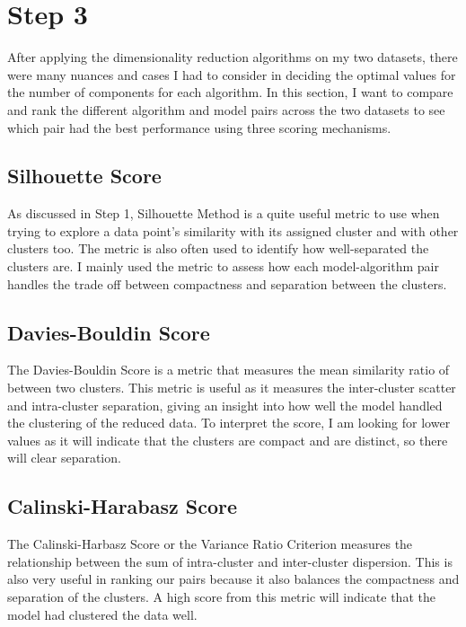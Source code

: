 \documentclass[conference]{IEEEtran}
\begin{document}
\section{Step 3}
After applying the dimensionality reduction algorithms on my two datasets, there were many nuances and cases I had to consider in deciding the optimal values for the number of components for each algorithm. In this section, I want to compare and rank the different algorithm and model pairs across the two datasets to see which pair had the best performance using three scoring mechanisms.
\subsection{Silhouette Score}
\par As discussed in Step 1, Silhouette Method is a quite useful metric to use when trying to explore a data point's similarity with its assigned cluster and with other clusters too. The metric is also often used to identify how well-separated the clusters are. I mainly used the metric to assess how each model-algorithm pair handles the trade off between compactness and separation between the clusters.
\subsection{Davies-Bouldin Score}
\par The Davies-Bouldin Score is a metric that measures the mean similarity ratio of between two clusters. This metric is useful as it measures the inter-cluster scatter and intra-cluster separation, giving an insight into how well the model handled the clustering of the reduced data. To interpret the score, I am looking for lower values as it will indicate that the clusters are compact and are distinct, so there will clear separation.
\subsection{Calinski-Harabasz Score}
The Calinski-Harbasz Score or the Variance Ratio Criterion measures the relationship between the sum of intra-cluster and inter-cluster dispersion. This is also very useful in ranking our pairs because it also balances the compactness and separation of the clusters. A high score from this metric will indicate that the model had clustered the data well.
\end{document}

